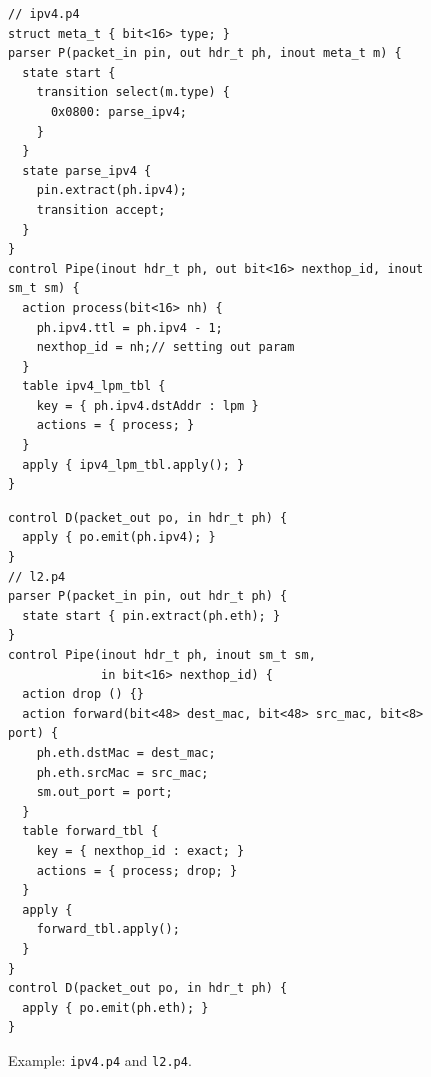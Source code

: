 \begin{figure}[!ht]
\noindent \begin{minipage}[t]{.48\textwidth}
\begin{lstlisting}[frame=none]
// ipv4.p4
struct meta_t { bit<16> type; }
parser P(packet_in pin, out hdr_t ph, inout meta_t m) {
  state start {
    transition select(m.type) {
      0x0800: parse_ipv4; 
    }
  }
  state parse_ipv4 { 
    pin.extract(ph.ipv4); 
    transition accept; 
  }
}
control Pipe(inout hdr_t ph, out bit<16> nexthop_id, inout sm_t sm) {
  action process(bit<16> nh) {
    ph.ipv4.ttl = ph.ipv4 - 1;
    nexthop_id = nh;// setting out param
  }
  table ipv4_lpm_tbl {
    key = { ph.ipv4.dstAddr : lpm } 
    actions = { process; }
  }
  apply { ipv4_lpm_tbl.apply(); }
}
\end{lstlisting}
\end{minipage}\vline
\hfill\begin{minipage}[t]{.48\textwidth}
\begin{lstlisting}[frame=none]
control D(packet_out po, in hdr_t ph) {
  apply { po.emit(ph.ipv4); }
}
// l2.p4
parser P(packet_in pin, out hdr_t ph) {
  state start { pin.extract(ph.eth); }
}
control Pipe(inout hdr_t ph, inout sm_t sm, 
             in bit<16> nexthop_id) {
  action drop () {}           
  action forward(bit<48> dest_mac, bit<48> src_mac, bit<8> port) {
    ph.eth.dstMac = dest_mac;
    ph.eth.srcMac = src_mac;
    sm.out_port = port;    
  }
  table forward_tbl {
    key = { nexthop_id : exact; } 
    actions = { process; drop; }
  }
  apply {
    forward_tbl.apply(); 
  }
}
control D(packet_out po, in hdr_t ph) {
  apply { po.emit(ph.eth); }
}
\end{lstlisting}
\end{minipage}
\caption{Example: \texttt{ipv4.p4} and \texttt{l2.p4}.}
\label{fig:ipv4.p4.l2.p4}
\end{figure}



